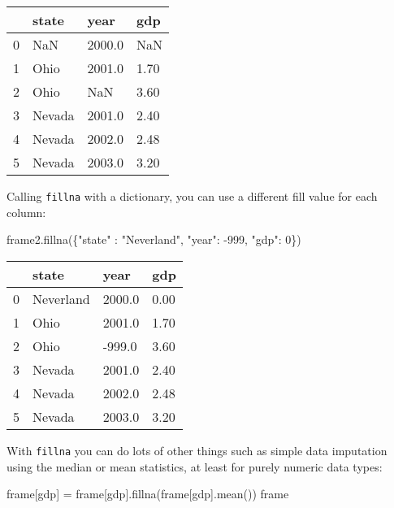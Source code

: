 \documentclass[
  letterpaper,
  DIV=11,
  numbers=noendperiod]{scrreprt}
\newenvironment{Shaded}{\begin{snugshade}}{\end{snugshade}}
\newcommand{\DecValTok}[1]{\textcolor[rgb]{0.68,0.00,0.00}{#1}}
\newcommand{\NormalTok}[1]{\textcolor[rgb]{0.00,0.23,0.31}{#1}}
\newcommand{\OperatorTok}[1]{\textcolor[rgb]{0.37,0.37,0.37}{#1}}
\newcommand{\StringTok}[1]{\textcolor[rgb]{0.13,0.47,0.30}{#1}}
\begin{document}
\begin{longtable}[]{@{}llll@{}}
\toprule()
& state & year & gdp \\
\midrule()
\endhead
0 & NaN & 2000.0 & NaN \\
1 & Ohio & 2001.0 & 1.70 \\
2 & Ohio & NaN & 3.60 \\
3 & Nevada & 2001.0 & 2.40 \\
4 & Nevada & 2002.0 & 2.48 \\
5 & Nevada & 2003.0 & 3.20 \\
\bottomrule()
\end{longtable}

Calling \texttt{fillna} with a dictionary, you can use a different fill
value for each column:

\begin{Shaded}
\begin{Highlighting}[]
\NormalTok{frame2.fillna(\{}\StringTok{"state"}\NormalTok{ : }\StringTok{"Neverland"}\NormalTok{, }\StringTok{"year"}\NormalTok{: }\OperatorTok{{-}}\DecValTok{999}\NormalTok{, }\StringTok{"gdp"}\NormalTok{: }\DecValTok{0}\NormalTok{\})}
\end{Highlighting}
\end{Shaded}

\begin{longtable}[]{@{}llll@{}}
\toprule()
& state & year & gdp \\
\midrule()
\endhead
0 & Neverland & 2000.0 & 0.00 \\
1 & Ohio & 2001.0 & 1.70 \\
2 & Ohio & -999.0 & 3.60 \\
3 & Nevada & 2001.0 & 2.40 \\
4 & Nevada & 2002.0 & 2.48 \\
5 & Nevada & 2003.0 & 3.20 \\
\bottomrule()
\end{longtable}

With \texttt{fillna} you can do lots of other things such as simple data
imputation using the median or mean statistics, at least for purely
numeric data types:

\begin{Shaded}
\begin{Highlighting}[]
\NormalTok{frame[}\StringTok{\textquotesingle{}gdp\textquotesingle{}}\NormalTok{] }\OperatorTok{=}\NormalTok{ frame[}\StringTok{\textquotesingle{}gdp\textquotesingle{}}\NormalTok{].fillna(frame[}\StringTok{\textquotesingle{}gdp\textquotesingle{}}\NormalTok{].mean())}
\NormalTok{frame}
\end{Highlighting}
\end{Shaded}
\end{document}
